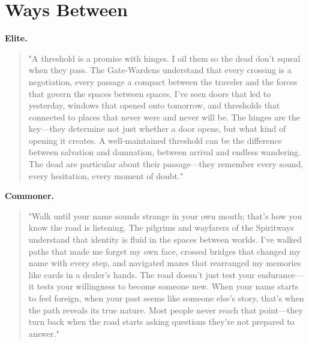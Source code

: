 \section*{Ways Between}
\textbf{Elite.}
\begin{quote}
"A threshold is a promise with hinges. I oil them so the dead don't squeal when they pass. The Gate-Wardens understand that every crossing is a negotiation, every passage a compact between the traveler and the forces that govern the spaces between spaces. I've seen doors that led to yesterday, windows that opened onto tomorrow, and thresholds that connected to places that never were and never will be. The hinges are the key—they determine not just whether a door opens, but what kind of opening it creates. A well-maintained threshold can be the difference between salvation and damnation, between arrival and endless wandering. The dead are particular about their passage—they remember every sound, every hesitation, every moment of doubt."
\end{quote}
\textbf{Commoner.}
\begin{quote}
"Walk until your name sounds strange in your own mouth; that's how you know the road is listening. The pilgrims and wayfarers of the Spiritways understand that identity is fluid in the spaces between worlds. I've walked paths that made me forget my own face, crossed bridges that changed my name with every step, and navigated mazes that rearranged my memories like cards in a dealer's hands. The road doesn't just test your endurance—it tests your willingness to become someone new. When your name starts to feel foreign, when your past seems like someone else's story, that's when the path reveals its true nature. Most people never reach that point—they turn back when the road starts asking questions they're not prepared to answer."
\end{quote}

